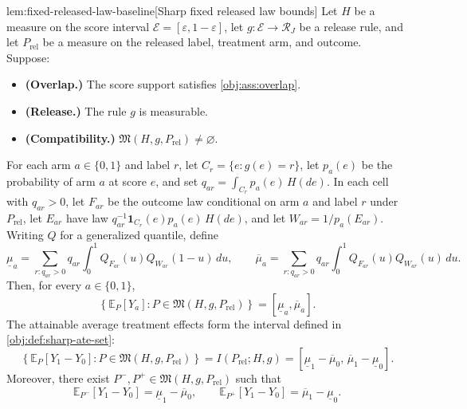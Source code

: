 \documentclass[11pt]{article}
\begin{document}
\begin{lemmav}{lem:fixed-released-law-baseline}[Sharp fixed released law bounds]
Let \(H\) be a measure on the score interval \(\mathcal E=[\varepsilon,1-\varepsilon]\), let \(g:\mathcal E\to\mathcal R_J\) be a release rule, and let \(P_{\mathrm{rel}}\) be a measure on the released label, treatment arm, and outcome. Suppose:

\begin{itemize}
\item \textbf{(Overlap.)} The score support satisfies \cref{obj:ass:overlap}.
\item \textbf{(Release.)} The rule \(g\) is measurable.
\item \textbf{(Compatibility.)} \(\mathfrak M(H,g,P_{\mathrm{rel}})\ne\varnothing\).
\end{itemize}

For each arm \(a\in\{0,1\}\) and label \(r\), let \(C_r=\{e:g(e)=r\}\), let \(p_a(e)\) be the probability of arm \(a\) at score \(e\), and set \(q_{ar}=\int_{C_r}p_a(e)\,H(de)\). In each cell with \(q_{ar}>0\), let \(F_{ar}\) be the outcome law conditional on arm \(a\) and label \(r\) under \(P_{\mathrm{rel}}\), let \(E_{ar}\) have law \(q_{ar}^{-1}\mathbf 1_{C_r}(e)p_a(e)\,H(de)\), and let \(W_{ar}=1/p_a(E_{ar})\). Writing \(Q\) for a generalized quantile, define
\[
\underline\mu_a
=\sum_{r:q_{ar}>0}q_{ar}\int_0^1 Q_{F_{ar}}(u)Q_{W_{ar}}(1-u)\,du,
\qquad
\overline\mu_a
=\sum_{r:q_{ar}>0}q_{ar}\int_0^1 Q_{F_{ar}}(u)Q_{W_{ar}}(u)\,du.
\]
Then, for every \(a\in\{0,1\}\),
\[
\left\{\mathbb E_P[Y_a]:P\in\mathfrak M(H,g,P_{\mathrm{rel}})\right\}
=[\underline\mu_a,\overline\mu_a].
\]
The attainable average treatment effects form the interval defined in \cref{obj:def:sharp-ate-set}:
\[
\left\{\mathbb E_P[Y_1-Y_0]:P\in\mathfrak M(H,g,P_{\mathrm{rel}})\right\}
=I(P_{\mathrm{rel}};H,g)
=[\underline\mu_1-\overline\mu_0,\,
  \overline\mu_1-\underline\mu_0].
\]
Moreover, there exist \(P^-,P^+\in\mathfrak M(H,g,P_{\mathrm{rel}})\) such that
\[
\mathbb E_{P^-}[Y_1-Y_0]=\underline\mu_1-\overline\mu_0,
\qquad
\mathbb E_{P^+}[Y_1-Y_0]=\overline\mu_1-\underline\mu_0.
\]
\end{lemmav}
\end{document}

